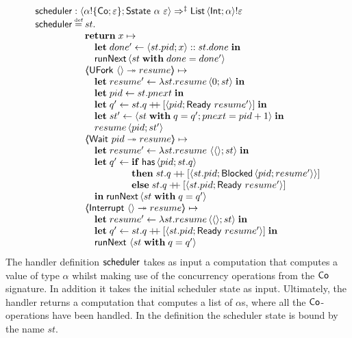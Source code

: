 \documentclass[12pt,phd,lfcs,twoside,openright,logo,leftchapter,normalheadings]{infthesis}
\theoremstyle{plain}
\theoremstyle{definition}
\begin{document}
\[
  \bl
    \scheduler : \Record{\alpha \eff \{\Co;\varepsilon\};\Sstate~\alpha~\varepsilon} \Harrow^\param \List\,\Record{\Int;\alpha} \eff \varepsilon\\
    \scheduler \defas
    \bl
    st.\\
      \bl
      \Return\;x \mapsto \\
      \quad\bl
             \Let\;done' \revto \Record{st.pid;x} \cons st.done\;\In\\
             \runNext\,\Record{st\;\With\;done = done'}
           \el\\
      \OpCase{\UFork}{\Unit}{resume} \mapsto\\
      \quad\bl
             \Let\;resume' \revto \lambda st.resume\,\Record{0;st}\;\In\\
             \Let\;pid \revto st.pnext \;\In\\
             \Let\;q' \revto  st.q \concat [\Record{pid;\Ready~resume'}]\;\In\\
             \Let\;st' \revto \Record{st\;\With\;q = q'; pnext = pid + 1}\;\In\\
             resume\,\Record{pid;st'}
           \el\\
      \OpCase{\Wait}{pid}{resume} \mapsto\\
      \quad\bl
             \Let\;resume' \revto \lambda st.resume~\Record{\Unit;st}\;\In\\
             \Let\;q' \revto
             \bl
             \If\;\dec{has}\,\Record{pid;st.q}\\
             \Then\;st.q \concat [\Record{st.pid;\Blocked\,\Record{pid;resume'}}]\\
             \Else\;st.q \concat [\Record{st.pid;\Ready~resume'}]
             \el\\
             \In\;\runNext\,\Record{st\;\With\;q = q'}
           \el\\
      \OpCase{\Interrupt}{\Unit}{resume} \mapsto\\
      \quad\bl
             \Let\;resume' \revto \lambda st.resume\,\Record{\Unit;st}\;\In\\
             \Let\;q' \revto st.q \concat [\Record{st.pid;\Ready~resume'}]\;\In\\
             \runNext~\Record{st \;\With\; q = q'}
           \el
      \el
     \el
  \el
\]
%
The handler definition $\mathsf{scheduler}$ takes as input a computation that
computes a value of type $\alpha$ whilst making use of the concurrency
operations from the $\mathsf{Co}$ signature. In addition it takes the initial
scheduler state as input. Ultimately, the handler returns a
computation that computes a list of $\alpha$s, where all the
$\mathsf{Co}$-operations have been handled.
%
In the definition the scheduler state is bound by the name $st$.
\end{document}
